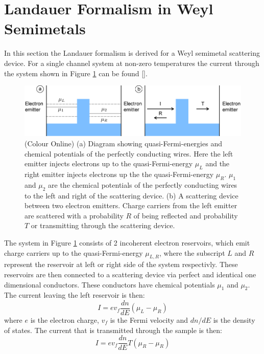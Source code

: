 \documentclass[12pt,a4paper]{article}
\begin{document}
		\section{Landauer Formalism in Weyl Semimetals}
			In this section the Landauer formalism is derived for a Weyl semimetal scattering device. For a single channel system at non-zero temperatures the current through the system shown in Figure \ref{introduction-current} can be found [].
			\begin{figure}[h]
				\centerline{\includegraphics[scale=0.5]{current}}
				\caption{(Colour Online) (a) Diagram showing quasi-Fermi-energies and chemical potentials of the perfectly conducting wires. Here the left emitter injects electrons up to the quasi-Fermi-energy $\mu_{L}$ and the right emitter injects electrons up the the quasi-Fermi-energy $\mu_{R}$. $\mu_{1}$ and $\mu_{2}$ are the chemical potentials of the perfectly conducting wires to the left and right of the scattering device. (b) A scattering device between two electron emitters. Charge carriers from the left emitter are scattered with a probability $R$ of being reflected and probability $T$ or transmitting through the scattering device.}
				\label{introduction-current}
			\end{figure}
			 The system in Figure \ref{introduction-current} consists of 2 incoherent electron reservoirs, which emit charge carriers up to the quasi-Fermi-energy $\mu_{L,R}$, where the subscript $L$ and $R$ represent the reservoir at left or right side of the system respectivly. These reservoirs are then connected to a scattering device via perfect and identical one dimensional conductors. These conductors have chemical potentials $\mu_{1}$ and $\mu_{2}$. The current leaving the left reservoir is then:
			\begin{equation}
				I=ev_{f}\frac{dn}{dE}\left(\mu_{L}-\mu_{R}\right)
				\label{current-dos}
			\end{equation}
			where $e$ is the electron charge, $v_{f}$ is the Fermi velocity and $dn/dE$ is the density of states. The current that is transmitted through the sample is then:
			\begin{equation}
				I=ev_{f}\frac{dn}{dE}T\left(\mu_{R}-\mu_{R}\right)
				\label{current-transmit}
			\end{equation}
\end{document}
